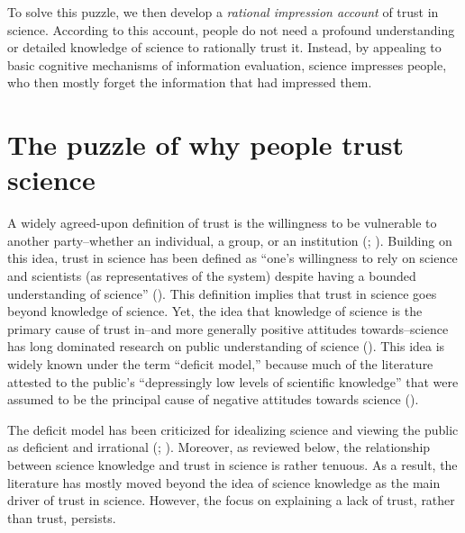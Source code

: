 \documentclass[
  jou,
  floatsintext,
  longtable,
  nolmodern,
  notxfonts,
  notimes,
  colorlinks=true,linkcolor=blue,citecolor=blue,urlcolor=blue]{apa7}
\begin{document}
To solve this puzzle, we then develop a \emph{rational impression
account} of trust in science. According to this account, people do not
need a profound understanding or detailed knowledge of science to
rationally trust it. Instead, by appealing to basic cognitive mechanisms
of information evaluation, science impresses people, who then mostly
forget the information that had impressed them.

\section{The puzzle of why people trust
science}\label{the-puzzle-of-why-people-trust-science}

A widely agreed-upon definition of trust is the willingness to be
vulnerable to another party--whether an individual, a group, or an
institution
(; ). Building on this idea, trust in science has been defined as
``one's willingness to rely on science and scientists (as
representatives of the system) despite having a bounded understanding of
science'' (). This definition implies that trust in science goes
beyond knowledge of science. Yet, the idea that knowledge of science is
the primary cause of trust in--and more generally positive attitudes
towards--science has long dominated research on public understanding of
science (). This
idea is widely known under the term ``deficit model,'' because much of
the literature attested to the public's ``depressingly low levels of
scientific knowledge'' that were assumed to be the principal cause of
negative attitudes towards science
().

The deficit model has been criticized for idealizing science and viewing
the public as deficient and irrational
(;
).
Moreover, as reviewed below, the relationship between science knowledge
and trust in science is rather tenuous. As a result, the literature has
mostly moved beyond the idea of science knowledge as the main driver of
trust in science. However, the focus on explaining a lack of trust,
rather than trust, persists.
\end{document}
